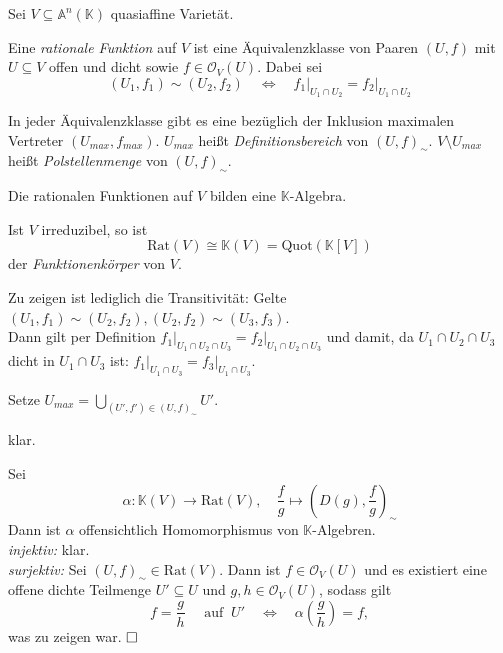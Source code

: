 \documentclass[11pt]{book}
\theoremstyle{nonumberbreak}
\newenvironment{pr}[1][]{\ifthenelse{\equal{#1}{}}{\proof}{\proof[#1]}\rm}{\endproof}
\newenvironment{definbem}[1][]{\ifthenelse{\equal{#1}{}}{\definibem}{\definibem[#1]}\rm}{\enddefinibem}
\begin{document}
\begin{spacing}{1.3}
\begin{definbem} %
Sei $V \subseteq \mathbb{A}^n(\mathbb{K})$ quasiaffine Varietät.
\begin{compactenum}
\item Eine \textit{rationale Funktion} auf $V$ ist eine Äquivalenzklasse von Paaren $(U,f)$ mit $U \subseteq V$ offen und dicht sowie $f \in \mathcal{O}_V(U)$. Dabei sei 
$$(U_1, f_1) \sim (U_2, f_2) \quad \Longleftrightarrow \quad f_1\vert _{U_1 \cap U_2} = f_2 \vert _{U_1 \cap U_2}$$
\item In jeder Äquivalenzklasse gibt es eine bezüglich der Inklusion maximalen Vertreter $(U_{max}, f_{max})$. $U_{max}$ heißt \textit{Definitionsbereich} von $(U,f)_{\sim}$. $V\setminus U_{max}$ heißt \textit{Polstellenmenge} von $(U,f)_{\sim}$.
\item Die rationalen Funktionen auf $V$ bilden eine $\mathbb{K}$-Algebra.
\item Ist $V$ irreduzibel, so ist
$$\textrm{Rat}(V) \cong \mathbb{K}(V) = \textrm{Quot}(\mathbb{K}[V])$$
der \textit{Funktionenkörper} von $V$.
\end{compactenum}
\begin{pr}
\begin{compactenum}
\item Zu zeigen ist lediglich die Transitivität: Gelte $(U_1, f_1) \sim (U_2, f_2), (U_2, f_2) \sim (U_3, f_3)$.\\
Dann gilt per Definition $f_1 \vert _{U_1 \cap U_2 \cap U_3}= f_2 \vert _{U_1 \cap U_2 \cap U_3}$ und damit, da $U_1 \cap U_2 \cap U_3$ dicht in $U_1 \cap U_3$ ist: $f_1 \vert _{U_1 \cap U_3} = f_3 \vert _{U_1 \cap U_3}$.
\item Setze 
$U_{max}= \bigcup_{(U',f') \in (U,f)_{\sim}} U'.$
\item klar.
\item Sei
$$\alpha: \mathbb{K}(V) \longrightarrow \textrm{Rat}(V), \quad \frac{f}{g} \mapsto \left(D(g), \frac{f}{g} \right)_{\sim} $$
Dann ist $\alpha$ offensichtlich Homomorphismus von $\mathbb{K}$-Algebren.\\
\textit{injektiv:} klar.\\
\textit{surjektiv:} Sei $(U,f)_{\sim} \in \textrm{Rat}(V)$. Dann ist $f \in \mathcal{O}_V(U)$ und es existiert eine offene dichte Teilmenge $U' \subseteq U$ und $g,h \in \mathcal{O}_V(U)$, sodass gilt
$$f= \frac{g}{h} \quad \textrm{ auf  }\ U' \quad \Longleftrightarrow \quad \alpha\left(\frac{g}{h}\right)=f,$$
was zu zeigen war. $\hfill \Box$
\end{compactenum}
\end{pr}
\end{definbem}


\end{spacing}
\end{document}
